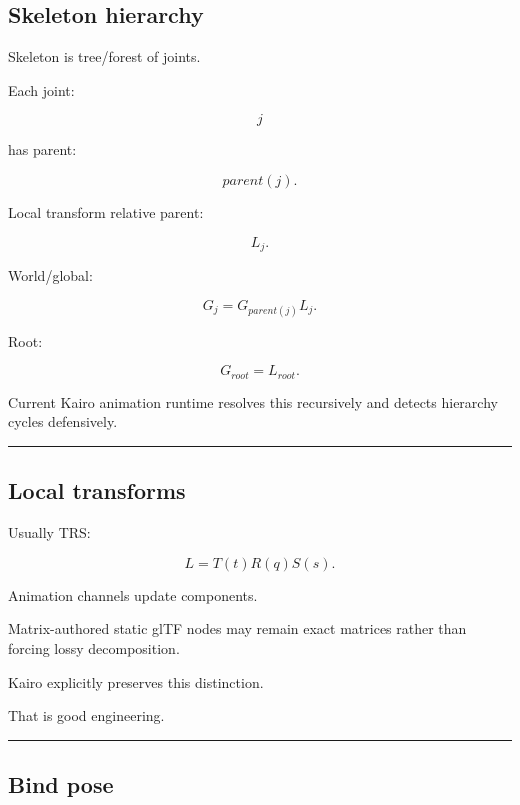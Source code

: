 \subsection{Skeleton hierarchy}\label{04-visual-computing-ii-ch041-skeleton-hierarchy}

\hypertarget{04-visual-computing-ii-ch041-skeleton-hierarchy}{}

Skeleton is tree/forest of joints.

Each joint:

\[
j
\]

has parent:

\[
parent(j).
\]

Local transform relative parent:

\[
L_j.
\]

World/global:

\[
\boxed{
G_j
=
G_{parent(j)}
L_j.
}
\]

Root:

\[
G_{root}=L_{root}.
\]

Current Kairo animation runtime resolves this recursively and detects hierarchy cycles defensively.

\begin{center}\rule{0.5\linewidth}{0.5pt}\end{center}

\subsection{Local transforms}\label{04-visual-computing-ii-ch041-local-transforms}

\hypertarget{04-visual-computing-ii-ch041-local-transforms}{}

Usually TRS:

\[
L=
T(t)
R(q)
S(s).
\]

Animation channels update components.

Matrix-authored static glTF nodes may remain exact matrices rather than forcing lossy decomposition.

Kairo explicitly preserves this distinction.

That is good engineering.

\begin{center}\rule{0.5\linewidth}{0.5pt}\end{center}

\subsection{Bind pose}\label{04-visual-computing-ii-ch041-bind-pose}

